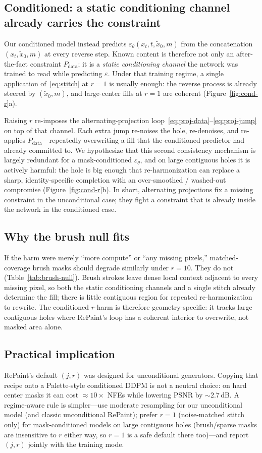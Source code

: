 \subsection{Conditioned: a static conditioning channel already carries the constraint}
Our conditioned model instead predicts $\varepsilon_\theta(x_t,t,\tilde{x}_0,m)$ from the concatenation $(x_t,\tilde{x}_0,m)$ at every reverse step.
Known content is therefore not only an after-the-fact constraint $P_{\mathrm{data}}$; it is a \emph{static conditioning channel} the network was trained to read while predicting $\varepsilon$.
Under that training regime, a single application of~\eqref{eq:stitch} at $r{=}1$ is usually enough: the reverse process is already steered by $(\tilde{x}_0,m)$, and large-center fills at $r{=}1$ are coherent (Figure~\ref{fig:cond-r}a).

Raising $r$ re-imposes the alternating-projection loop~\eqref{eq:proj-data}--\eqref{eq:proj-jump} on top of that channel.
Each extra jump re-noises the hole, re-denoises, and re-applies $P_{\mathrm{data}}$---repeatedly overwriting a fill that the conditioned predictor had already committed to.
We hypothesize that this second consistency mechanism is largely redundant for a mask-conditioned $\varepsilon_\theta$, and on large contiguous holes it is actively harmful: the hole is big enough that re-harmonization can replace a sharp, identity-specific completion with an over-smoothed / washed-out compromise (Figure~\ref{fig:cond-r}b).
In short, alternating projections fix a missing constraint in the unconditional case; they fight a constraint that is already inside the network in the conditioned case.

\subsection{Why the brush null fits}
If the harm were merely ``more compute'' or ``any missing pixels,'' matched-coverage brush masks should degrade similarly under $r{=}10$.
They do not (Table~\ref{tab:brush-null}).
Brush strokes leave dense local context adjacent to every missing pixel, so both the static conditioning channels and a single stitch already determine the fill; there is little contiguous region for repeated re-harmonization to rewrite.
The conditioned $r$-harm is therefore geometry-specific: it tracks large contiguous holes where RePaint's loop has a coherent interior to overwrite, not masked area alone.

\subsection{Practical implication}
RePaint's default $(j,r)$ was designed for unconditional generators.
Copying that recipe onto a Palette-style conditioned DDPM is not a neutral choice: on hard center masks it can cost ${\approx}10{\times}$ NFEs while lowering PSNR by ${\sim}2.7$\,dB.
A regime-aware rule is simpler---use moderate resampling for our unconditional model (and classic unconditional RePaint); prefer $r{=}1$ (noise-matched stitch only) for mask-conditioned models on large contiguous holes (brush/sparse masks are insensitive to $r$ either way, so $r{=}1$ is a safe default there too)---and report $(j,r)$ jointly with the training mode.

